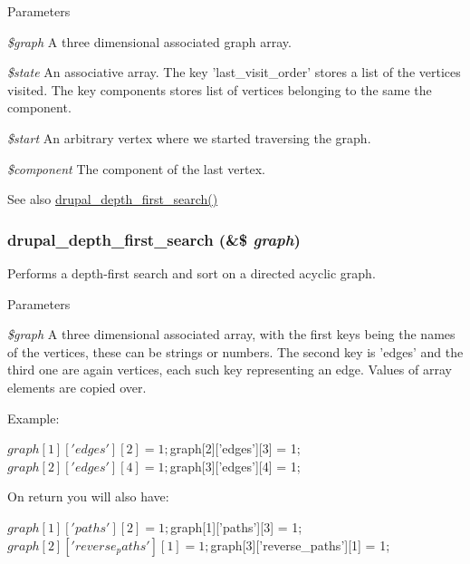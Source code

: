\begin{DoxyParams}{Parameters}
\item[{\em \$graph}]A three dimensional associated graph array. \item[{\em \$state}]An associative array. The key 'last\_\-visit\_\-order' stores a list of the vertices visited. The key components stores list of vertices belonging to the same the component. \item[{\em \$start}]An arbitrary vertex where we started traversing the graph. \item[{\em \$component}]The component of the last vertex.\end{DoxyParams}
\begin{DoxySeeAlso}{See also}
\hyperlink{graph_8inc_ab1e9257090d35212bd3dd3eba7706471}{drupal\_\-depth\_\-first\_\-search()} 
\end{DoxySeeAlso}
\hypertarget{graph_8inc_ab1e9257090d35212bd3dd3eba7706471}{
\subsubsection[{drupal\_\-depth\_\-first\_\-search}]{\setlength{\rightskip}{0pt plus 5cm}drupal\_\-depth\_\-first\_\-search (\&\$ {\em graph})}}
\label{graph_8inc_ab1e9257090d35212bd3dd3eba7706471}
Performs a depth-\/first search and sort on a directed acyclic graph.


\begin{DoxyParams}{Parameters}
\item[{\em \$graph}]A three dimensional associated array, with the first keys being the names of the vertices, these can be strings or numbers. The second key is 'edges' and the third one are again vertices, each such key representing an edge. Values of array elements are copied over.\end{DoxyParams}
Example: 
\begin{DoxyCode}
     $graph[1]['edges'][2] = 1;
     $graph[2]['edges'][3] = 1;
     $graph[2]['edges'][4] = 1;
     $graph[3]['edges'][4] = 1;
\end{DoxyCode}


On return you will also have: 
\begin{DoxyCode}
     $graph[1]['paths'][2] = 1;
     $graph[1]['paths'][3] = 1;
     $graph[2]['reverse_paths'][1] = 1;
     $graph[3]['reverse_paths'][1] = 1;
\end{DoxyCode}


